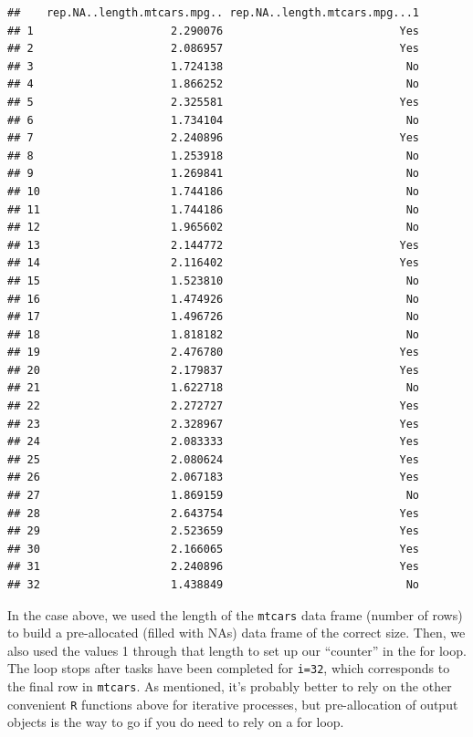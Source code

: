 \documentclass[]{book}
\begin{document}
\begin{verbatim}
##    rep.NA..length.mtcars.mpg.. rep.NA..length.mtcars.mpg...1
## 1                     2.290076                           Yes
## 2                     2.086957                           Yes
## 3                     1.724138                            No
## 4                     1.866252                            No
## 5                     2.325581                           Yes
## 6                     1.734104                            No
## 7                     2.240896                           Yes
## 8                     1.253918                            No
## 9                     1.269841                            No
## 10                    1.744186                            No
## 11                    1.744186                            No
## 12                    1.965602                            No
## 13                    2.144772                           Yes
## 14                    2.116402                           Yes
## 15                    1.523810                            No
## 16                    1.474926                            No
## 17                    1.496726                            No
## 18                    1.818182                            No
## 19                    2.476780                           Yes
## 20                    2.179837                           Yes
## 21                    1.622718                            No
## 22                    2.272727                           Yes
## 23                    2.328967                           Yes
## 24                    2.083333                           Yes
## 25                    2.080624                           Yes
## 26                    2.067183                           Yes
## 27                    1.869159                            No
## 28                    2.643754                           Yes
## 29                    2.523659                           Yes
## 30                    2.166065                           Yes
## 31                    2.240896                           Yes
## 32                    1.438849                            No
\end{verbatim}

In the case above, we used the length of the \texttt{mtcars} data frame (number of rows) to build a pre-allocated (filled with NAs) data frame of the correct size. Then, we also used the values 1 through that length to set up our ``counter'' in the for loop. The loop stops after tasks have been completed for \texttt{i=32}, which corresponds to the final row in \texttt{mtcars}. As mentioned, it's probably better to rely on the other convenient \texttt{R} functions above for iterative processes, but pre-allocation of output objects is the way to go if you do need to rely on a for loop.
\end{document}
